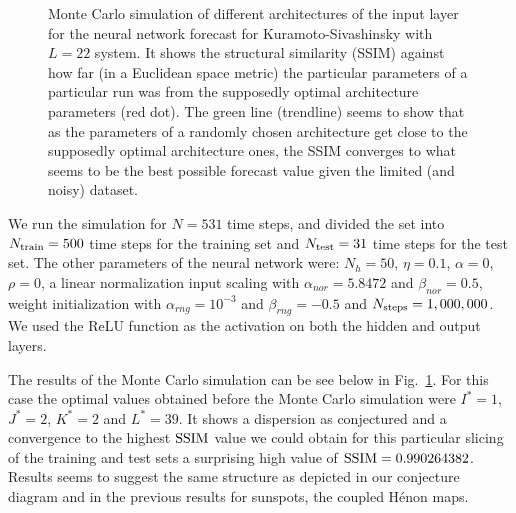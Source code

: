 \documentclass[journal]{IEEEtran}
\begin{document}
\begin{figure}[!ht]
\centering
{}
\caption{Monte Carlo simulation of different architectures of the input layer for the neural network forecast for
Kuramoto-Sivashinsky with $L=22$ system.
It shows the structural similarity (SSIM) against how far (in a Euclidean space metric) the particular parameters of a particular
run was from the supposedly optimal architecture parameters (red dot). The green line (trendline) seems to show that as the parameters
of a randomly chosen architecture get close to the supposedly optimal architecture ones, the SSIM converges to what seems to be the
best possible forecast value given the limited (and noisy) dataset.}
\label{MonteCarloSSIMversusParameterMetricDistanceKS_L=22}
\end{figure}

We run the simulation for $N=531$ time steps, and divided the set into $N_{\textnormal{train}}=500$ time steps for the training set
and $N_{\textnormal{test}}=31$ time steps for the test set. The other parameters of the neural network were:
$N_h=50$, $\eta=0.1$, $\alpha=0$, $\rho=0$, a linear normalization input scaling with 
$\alpha_{nor} = 5.8472$ and $\beta_{nor} =0.5$, weight initialization 
with $\alpha_{rng} = 10^{-3}$ and $\beta_{rng} = -0.5$ and $N_{\textnormal{steps}}=1,000,000$. 
We used the ReLU function as the activation on both the hidden and output layers.

The results of the Monte Carlo simulation can be see below in Fig.\ \ref{MonteCarloSSIMversusParameterMetricDistanceKS_L=22}. For this 
case the optimal values obtained before the Monte Carlo simulation were $I^*=1$, $J^*=2$, $K^*=2$ and $L^*=39$. It shows a dispersion as 
conjectured and a convergence to the highest $\textnormal{SSIM}$ value we could obtain for this particular slicing of the training and 
test sets a surprising high value of $\textnormal{SSIM}=0.990264382$. Results seems to suggest the same structure as depicted in our 
conjecture diagram and in the previous results for sunspots, the coupled H\'{e}non maps. 
\end{document}
